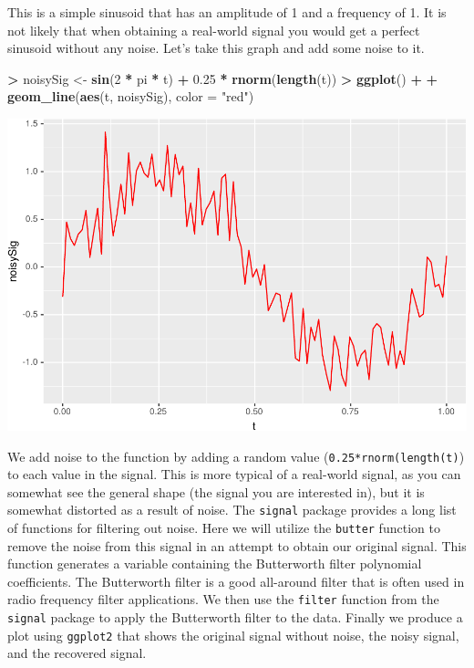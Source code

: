 \documentclass[]{krantz}
\makeatletter
\newenvironment{Shaded}{\begin{snugshade}}{\end{snugshade}}
\newcommand{\DataTypeTok}[1]{\textcolor[rgb]{0.27,0.27,0.27}{#1}}
\newcommand{\DecValTok}[1]{\textcolor[rgb]{0.06,0.06,0.06}{#1}}
\newcommand{\FloatTok}[1]{\textcolor[rgb]{0.06,0.06,0.06}{#1}}
\newcommand{\KeywordTok}[1]{\textcolor[rgb]{0.27,0.27,0.27}{\textbf{#1}}}
\newcommand{\NormalTok}[1]{#1}
\newcommand{\OperatorTok}[1]{\textcolor[rgb]{0.43,0.43,0.43}{\textbf{#1}}}
\newcommand{\StringTok}[1]{\textcolor[rgb]{0.5,0.5,0.5}{#1}}
\newenvironment{kframe}{%
\medskip{}
\setlength{\fboxsep}{.8em}
 \def\at@end@of@kframe{}%
 \ifinner\ifhmode%
  \def\at@end@of@kframe{\end{minipage}}%
  \begin{minipage}{\columnwidth}%
 \fi\fi%
 \def\FrameCommand##1{\hskip\@totalleftmargin \hskip-\fboxsep
 \colorbox{shadecolor}{##1}\hskip-\fboxsep
     \hskip-\linewidth \hskip-\@totalleftmargin \hskip\columnwidth}%
 \MakeFramed {\advance\hsize-\width
   \@totalleftmargin\z@ \linewidth\hsize
   \@setminipage}}%
 {\par\unskip\endMakeFramed%
 \at@end@of@kframe}
\renewenvironment{Shaded}{\begin{kframe}}{\end{kframe}}
\makeatother
\begin{document}
This is a simple sinusoid that has an amplitude of 1 and a frequency of 1. It is not likely that when obtaining a real-world signal you would get a perfect sinusoid without any noise. Let's take this graph and add some noise to it.

\begin{Shaded}
\begin{Highlighting}[]
\OperatorTok{>}\StringTok{ }\NormalTok{noisySig <-}\StringTok{ }\KeywordTok{sin}\NormalTok{(}\DecValTok{2} \OperatorTok{*}\StringTok{ }\NormalTok{pi }\OperatorTok{*}\StringTok{ }\NormalTok{t) }\OperatorTok{+}\StringTok{ }\FloatTok{0.25} \OperatorTok{*}\StringTok{ }\KeywordTok{rnorm}\NormalTok{(}\KeywordTok{length}\NormalTok{(t))}
\OperatorTok{>}\StringTok{ }\KeywordTok{ggplot}\NormalTok{() }\OperatorTok{+}\StringTok{ }
\OperatorTok{+}\StringTok{   }\KeywordTok{geom_line}\NormalTok{(}\KeywordTok{aes}\NormalTok{(t, noisySig), }\DataTypeTok{color =} \StringTok{"red"}\NormalTok{)}
\end{Highlighting}
\end{Shaded}

\includegraphics{bookdown_files/figure-latex/unnamed-chunk-310-1.pdf}

We add noise to the function by adding a random value (\texttt{0.25*rnorm(length(t)}) to each value in the signal. This is more typical of a real-world signal, as you can somewhat see the general shape (the signal you are interested in), but it is somewhat distorted as a result of noise. The \texttt{signal} package provides a long list of functions for filtering out noise. Here we will utilize the \texttt{butter} function to remove the noise from this signal in an attempt to obtain our original signal. This function generates a variable containing the Butterworth filter polynomial coefficients. The Butterworth filter is a good all-around filter that is often used in radio frequency filter applications. We then use the \texttt{filter} function from the \texttt{signal} package to apply the Butterworth filter to the data. Finally we produce a plot using \texttt{ggplot2} that shows the original signal without noise, the noisy signal, and the recovered signal.
\end{document}

